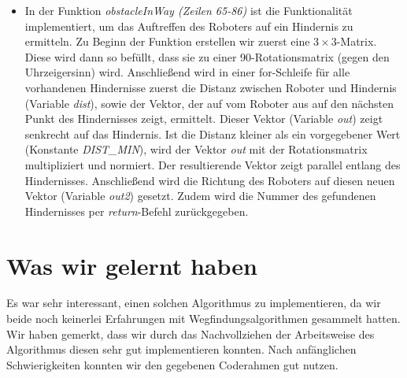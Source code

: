 \documentclass[a4paper]{scrartcl}
\begin{document}
\begin{itemize}
\item In der Funktion \textit{obstacleInWay (Zeilen 65-86)} ist die Funktionalität implementiert, um das Auftreffen des Roboters auf ein Hindernis zu ermitteln. Zu Beginn der Funktion erstellen wir zuerst eine $3\times3$-Matrix. Diese wird dann so befüllt, dass sie zu einer 90\textdegree -Rotationsmatrix (gegen den Uhrzeigersinn) wird. Anschließend wird in einer for-Schleife für alle vorhandenen Hindernisse zuerst die Distanz zwischen Roboter und Hindernis (Variable \textit{dist}), sowie der Vektor, der auf vom Roboter aus auf den nächsten Punkt des Hindernisses zeigt, ermittelt. Dieser Vektor (Variable \textit{out}) zeigt senkrecht auf das Hindernis. Ist die Distanz kleiner als ein vorgegebener Wert (Konstante \textit{DIST\_MIN}), wird der Vektor \textit{out} mit der Rotationsmatrix multipliziert und normiert. Der resultierende Vektor zeigt parallel entlang des Hindernisses. Anschließend wird die Richtung des Roboters auf diesen neuen Vektor (Variable \textit{out2}) gesetzt. Zudem wird die Nummer des gefundenen Hindernisses per \textit{return}-Befehl zurückgegeben.
\end{itemize}

\section*{Was wir gelernt haben}

Es war sehr interessant, einen solchen Algorithmus zu implementieren, da wir beide noch keinerlei Erfahrungen mit Wegfindungsalgorithmen gesammelt hatten.\\

Wir haben gemerkt, dass wir durch  das Nachvollziehen der Arbeitsweise des Algorithmus diesen sehr gut implementieren konnten. Nach anfänglichen Schwierigkeiten konnten wir den gegebenen Coderahmen gut nutzen.
\end{document}
